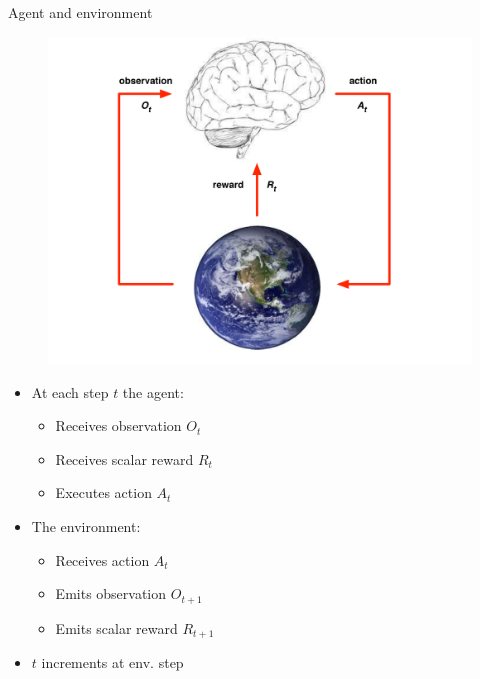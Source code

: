 \bgroup
\begin{frame}{Agent and environment}
\begin{minipage}{0.45\textwidth}
\begin{figure}
\centering
\includegraphics[width=\textwidth]{img/agent_and_environment.pdf}
\end{figure}
\end{minipage}
\begin{minipage}{0.45\textwidth}
\begin{itemize}
\item At each step $t$ the agent:
\begin{itemize}
\item Receives observation $O_t$
\item Receives scalar reward $R_t$
\item Executes action $A_t$
\end{itemize}
\item The environment:
\begin{itemize}
\item Receives action $A_t$
\item Emits observation $O_{t+1}$
\item Emits scalar reward $R_{t+1}$
\end{itemize}
\item $t$ increments at env. step
\end{itemize}
\end{minipage}
\end{frame}
\egroup